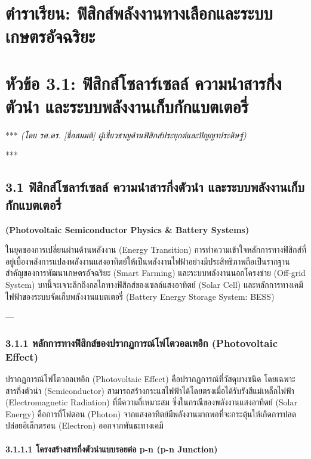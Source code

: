 \documentclass[11pt,a4paper,openany]{report}
\begin{document}
\chapter{ตำราเรียน: ฟิสิกส์พลังงานทางเลือกและระบบเกษตรอัจฉริยะ}

\chapter{หัวข้อ 3.1: ฟิสิกส์โซลาร์เซลล์ ความนำสารกึ่งตัวนำ และระบบพลังงานเก็บกักแบตเตอรี่}

***
\textit{(โดย รศ.ดร. [ชื่อสมมติ] ผู้เชี่ยวชาญด้านฟิสิกส์ประยุกต์และปัญญาประดิษฐ์)}

***

\section{3.1 ฟิสิกส์โซลาร์เซลล์ ความนำสารกึ่งตัวนำ และระบบพลังงานเก็บกักแบตเตอรี่}

\textbf{(Photovoltaic Semiconductor Physics \& Battery Systems)}

ในยุคของการเปลี่ยนผ่านด้านพลังงาน (Energy Transition) การทำความเข้าใจหลักการทางฟิสิกส์ที่อยู่เบื้องหลังการแปลงพลังงานแสงอาทิตย์ให้เป็นพลังงานไฟฟ้าอย่างมีประสิทธิภาพถือเป็นรากฐานสำคัญของการพัฒนาเกษตรอัจฉริยะ (Smart Farming) และระบบพลังงานนอกโครงข่าย (Off-grid System) บทนี้จะเจาะลึกถึงกลไกทางฟิสิกส์ของเซลล์แสงอาทิตย์ (Solar Cell) และหลักการทางเคมีไฟฟ้าของระบบจัดเก็บพลังงานแบตเตอรี่ (Battery Energy Storage System: BESS)

---

\subsection{3.1.1 หลักการทางฟิสิกส์ของปรากฏการณ์โฟโตวอลเทอิก (Photovoltaic Effect)}


ปรากฏการณ์โฟโตวอลเทอิก (Photovoltaic Effect) คือปรากฏการณ์ที่วัสดุบางชนิด โดยเฉพาะสารกึ่งตัวนำ (Semiconductor) สามารถสร้างกระแสไฟฟ้าได้โดยตรงเมื่อได้รับรังสีแม่เหล็กไฟฟ้า (Electromagnetic Radiation) ที่มีความถี่เหมาะสม ซึ่งในกรณีของพลังงานแสงอาทิตย์ (Solar Energy) คือการที่โฟตอน (Photon) จากแสงอาทิตย์มีพลังงานมากพอที่จะกระตุ้นให้เกิดการปลดปล่อยอิเล็กตรอน (Electron) ออกจากพันธะทางเคมี

\subsubsection{3.1.1.1 โครงสร้างสารกึ่งตัวนำแบบรอยต่อ p-n (p-n Junction)}
\end{document}
